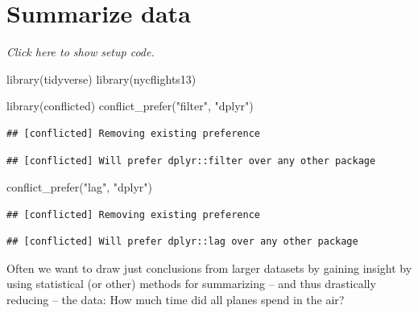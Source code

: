 \documentclass[]{book}
\newenvironment{Shaded}{}{}
\newcommand{\DataTypeTok}[1]{#1}
\newcommand{\KeywordTok}[1]{\textcolor[rgb]{0.00,0.00,1.00}{#1}}
\newcommand{\NormalTok}[1]{#1}
\newcommand{\OperatorTok}[1]{#1}
\newcommand{\OtherTok}[1]{\textcolor[rgb]{1.00,0.25,0.00}{#1}}
\newcommand{\StringTok}[1]{\textcolor[rgb]{0.00,0.50,0.50}{#1}}
\begin{document}
\hypertarget{summarize-data}{%
\section{Summarize data}\label{summarize-data}}

\emph{Click here to show setup code.}

\begin{Shaded}
\begin{Highlighting}[]
\KeywordTok{library}\NormalTok{(tidyverse)}
\KeywordTok{library}\NormalTok{(nycflights13)}

\KeywordTok{library}\NormalTok{(conflicted)}
\KeywordTok{conflict_prefer}\NormalTok{(}\StringTok{"filter"}\NormalTok{, }\StringTok{"dplyr"}\NormalTok{)}
\end{Highlighting}
\end{Shaded}

\begin{verbatim}
## [conflicted] Removing existing preference
\end{verbatim}

\begin{verbatim}
## [conflicted] Will prefer dplyr::filter over any other package
\end{verbatim}

\begin{Shaded}
\begin{Highlighting}[]
\KeywordTok{conflict_prefer}\NormalTok{(}\StringTok{"lag"}\NormalTok{, }\StringTok{"dplyr"}\NormalTok{)}
\end{Highlighting}
\end{Shaded}

\begin{verbatim}
## [conflicted] Removing existing preference
\end{verbatim}

\begin{verbatim}
## [conflicted] Will prefer dplyr::lag over any other package
\end{verbatim}

Often we want to draw just conclusions from larger datasets by gaining insight by using statistical (or other) methods for summarizing -- and thus drastically reducing -- the data:
How much time did all planes spend in the air?

\begin{Shaded}
\end{Shaded}
\end{document}
